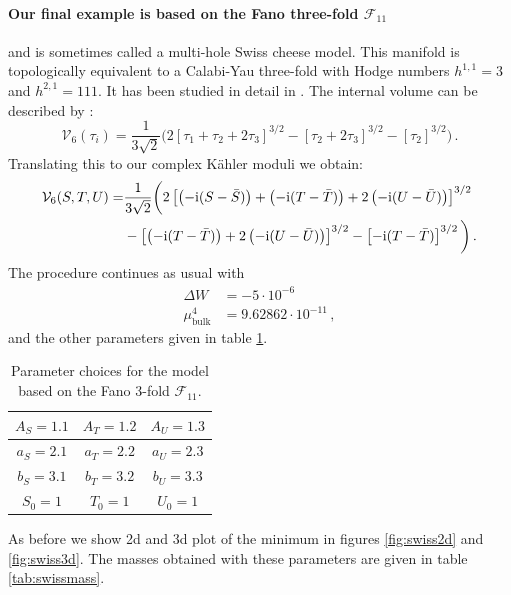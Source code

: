 \documentclass[12pt]{report}
\newcommand{\be}{\begin{equation}}
\newcommand{\ee}{\end{equation}}
\newcommand{\bea}{\begin{equation}\begin{aligned}}
\newcommand{\eea}{\end{aligned}\end{equation}}
\def\rmi{{\rm i}}
\begin{document}
\FloatBarrier
\paragraph{Our final example is based on the Fano three-fold $\mathcal{F}_{11}$} and is sometimes called a multi-hole Swiss cheese model. This manifold is topologically equivalent to a Calabi-Yau three-fold with Hodge numbers $h^{1,1} = 3$ and $h^{2,1} =111$. It has been studied in detail in \cite{Denef:2004dm}. The internal volume can be described by \cite{Cicoli:2008gp}:
\be 
\mathcal{V}_6 (\tau_i) = \frac{1}{3 \sqrt{2}} \bigg(2[\tau_1  + \tau_2 + 2 \tau_3]^{3/2} - [\tau_2 + 2 \tau_3]^{3/2} - [\tau_2]^{3/2}\bigg)\,.
\ee
Translating this to our complex Kähler moduli we obtain:
\bea
\mathcal{V}_6(S,T,U) = &\frac{1}{3 \sqrt{2}} \bigg( 2 \left[ \left(-\rmi (S-\bar{S})\right) +\left(-\rmi (T-\bar{T})\right) +2 \left(-\rmi (U-\bar{U})\right)\right]^{3/2}\\
&- \left[\left(-\rmi (T-\bar{T})\right) + 2\left(-\rmi (U-\bar{U})\right) \right]^{3/2} - \left[-\rmi (T-\bar{T})\right]^{3/2}\bigg)\,.
\eea
The procedure continues as usual with
\bea
\Delta W &= - 5 \cdot 10^{-6}\\
\mu^4_{\text{bulk}} &= 9.62862 \cdot 10^{-11}\,,
\eea
and the other parameters given in table \ref{tab:swisspara}.

\begin{table}[htb]
\centering
\begin{tabular}{|c|c|c|}\hline
$A_S = 1.1$ & $A_T = 1.2$ & $A_U =1.3$\\\hline
$a_S = 2.1$ & $a_T = 2.2$ & $a_U = 2.3$\\\hline
$b_S = 3.1$ & $b_T = 3.2$ & $b_U = 3.3$\\\hline
$S_0 = 1$ & $T_0 = 1$ & $U_0 = 1$\\\hline
\end{tabular}
\caption{ Parameter choices for the model based on the Fano 3-fold $\mathcal{F}_{11}$.}
\label{tab:swisspara}
\end{table}

As before we show 2d and 3d plot of the minimum in figures \ref{fig:swiss2d} and \ref{fig:swiss3d}. The masses obtained with these parameters are given in table \ref{tab:swissmass}.
\end{document}
